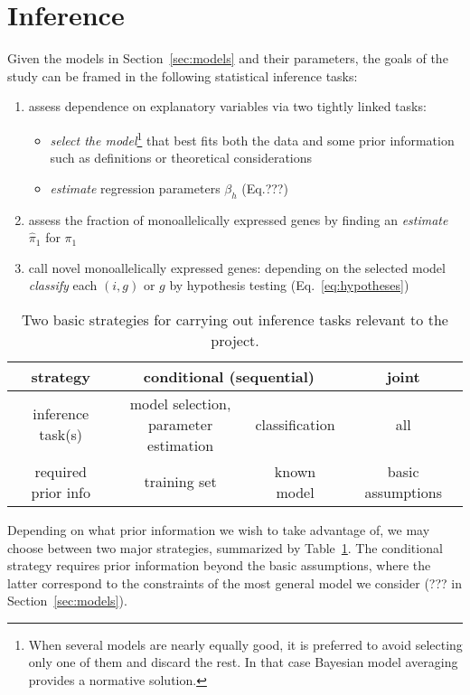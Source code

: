 \documentclass[letterpaper]{article}
\begin{document}
\section{Inference}
\label{sec:inference}

Given the models in Section~\ref{sec:models} and their parameters, the goals
of the study can be framed in the following statistical inference tasks:
\begin{enumerate}
\item assess dependence on explanatory variables via two tightly linked tasks:
\begin{itemize}
\item \emph{select the model}\footnote{When several models are nearly equally
good, it is preferred to avoid selecting only one of them and discard the
rest.  In that case Bayesian model averaging provides a normative solution. } that best fits both the data and some prior information
such as definitions or theoretical considerations
\item \emph{estimate} regression parameters \(\beta_h\) (Eq.???)
\end{itemize}
\item assess the fraction of monoallelically expressed genes by finding an
\emph{estimate} \(\hat{\pi}_1\) for \(\pi_1\)
\item call novel monoallelically expressed genes: depending on the selected
model \emph{classify} each \((i,g)\) or \(g\) by hypothesis testing
(Eq.~\ref{eq:hypotheses})
\end{enumerate}

\begin{table}[t]
\center
\begin{tabular}{c||c|c|c|}
\hline
strategy & \multicolumn{2}{|c|}{conditional (sequential)} & joint \\
\hline
inference task(s) & \parbox{3.5 cm}{\center model selection,\\parameter estimation} & classification & all \\
\hline
\parbox{2 cm}{\center required\\prior info} & training
set & known model & basic assumptions \\
\hline
\end{tabular}
\caption{Two basic strategies for carrying out inference tasks relevant to the project.}
\label{tab:inference-strategies}
\end{table}

Depending on what prior information we wish to take advantage of, we may
choose between two major strategies, summarized by
Table~\ref{tab:inference-strategies}.  The conditional strategy requires prior
information beyond the basic assumptions, where the latter correspond to the
constraints of the most general model we consider
(??? in Section~\ref{sec:models}).
\end{document}
